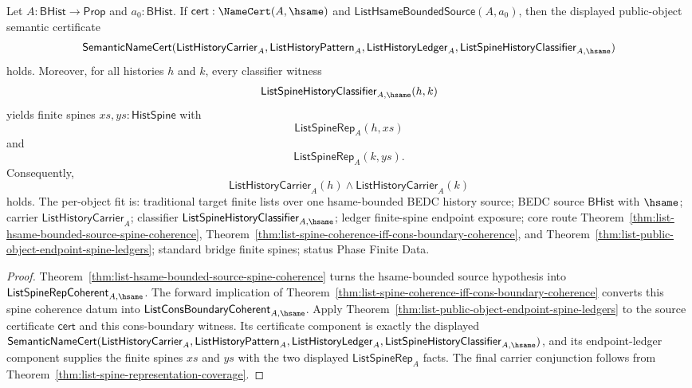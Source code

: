 \begin{theorem}
\label{thm:list-hsame-bounded-source-public-object-endpoint-spine-ledgers}
Let $A:\mathsf{BHist}\to\mathsf{Prop}$ and $a_0:\mathsf{BHist}$. If
$\mathsf{cert}:\NameCert(A,\hsame)$ and
$\mathsf{ListHsameBoundedSource}(A,a_0)$, then the displayed public-object
semantic certificate
$$
\mathsf{SemanticNameCert}(\mathsf{ListHistoryCarrier}_A,
\mathsf{ListHistoryPattern}_A,
\mathsf{ListHistoryLedger}_A,
\mathsf{ListSpineHistoryClassifier}_{A,\hsame})
$$
holds. Moreover, for all histories $h$ and $k$, every classifier witness
$$
\mathsf{ListSpineHistoryClassifier}_{A,\hsame}(h,k)
$$
yields finite spines $xs,ys:\mathsf{HistSpine}$ with
$$
\mathsf{ListSpineRep}_A(h,xs)
$$
and
$$
\mathsf{ListSpineRep}_A(k,ys).
$$
Consequently,
$$
\mathsf{ListHistoryCarrier}_A(h)\land\mathsf{ListHistoryCarrier}_A(k)
$$
holds. The per-object fit is: traditional target finite lists over one
hsame-bounded BEDC history source; BEDC source $\mathsf{BHist}$ with $\hsame$;
carrier $\mathsf{ListHistoryCarrier}_A$; classifier
$\mathsf{ListSpineHistoryClassifier}_{A,\hsame}$; ledger finite-spine endpoint
exposure; core route Theorem~\ref{thm:list-hsame-bounded-source-spine-coherence},
Theorem~\ref{thm:list-spine-coherence-iff-cons-boundary-coherence}, and
Theorem~\ref{thm:list-public-object-endpoint-spine-ledgers}; standard bridge
finite spines; status Phase Finite Data.
\end{theorem}
\begin{proof}
Theorem~\ref{thm:list-hsame-bounded-source-spine-coherence} turns the
hsame-bounded source hypothesis into
$\mathsf{ListSpineRepCoherent}_{A,\hsame}$. The forward implication of
Theorem~\ref{thm:list-spine-coherence-iff-cons-boundary-coherence} converts this
spine coherence datum into
$\mathsf{ListConsBoundaryCoherent}_{A,\hsame}$. Apply
Theorem~\ref{thm:list-public-object-endpoint-spine-ledgers} to the source
certificate $\mathsf{cert}$ and this cons-boundary witness. Its certificate
component is exactly the displayed
$\mathsf{SemanticNameCert}(\mathsf{ListHistoryCarrier}_A,
\mathsf{ListHistoryPattern}_A,\mathsf{ListHistoryLedger}_A,
\mathsf{ListSpineHistoryClassifier}_{A,\hsame})$, and its endpoint-ledger
component supplies the finite spines $xs$ and $ys$ with the two displayed
$\mathsf{ListSpineRep}_A$ facts. The final carrier conjunction follows from
Theorem~\ref{thm:list-spine-representation-coverage}.
\end{proof}

